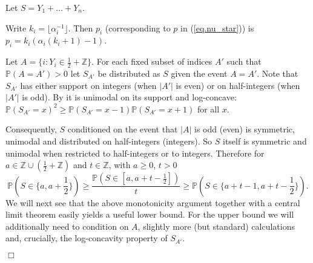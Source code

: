 \documentclass{article}
\newenvironment{proofof}[1]{\noindent {\bf Proof of #1}}{\hspace*{\fill}$\Box$}
\newcommand{\pr}{\mathbb P}
\begin{document}
\begin{proofof}{Lemma~\ref{lem.clt}}
    Let $S = Y_1 + \dots + Y_n$.

    Write $k_i = \lfloor \alpha_i^{-1} \rfloor$. Then $p_i$ (corresponding to $p$ in (\ref{eq.nu_star}))
    is $p_i = k_i (\alpha_i (k_i+1) - 1)$.


    Let $A = \{i: Y_i \in \frac 1 2 + \mathbb{Z}\}$. For each fixed subset of indices $A'$ such that $\pr(A = A') > 0$ let $S_{A'}$ be distributed as $S$ given the event $A = A'$.
    Note that $S_{A'}$ has either support on integers (when $|A'|$ is even) or on half-integers (when $|A'|$ is odd). By \cite{keilsongerber} it is unimodal on its support and log-concave: $\pr(S_{A'} = x)^2 \ge \pr(S_{A'}=x-1) \pr(S_{A'}=x+1)$ for all $x$.

    Consequently, $S$ conditioned on the event that $|A|$ is odd (even) is symmetric, unimodal and distributed on half-integers (integers).
    So $S$ itself is symmetric and unimodal when restricted to half-integers or to integers. Therefore for $a \in \mathbb{Z} \cup (\frac 1 2 + \mathbb{Z})$ and $t \in \mathbb{Z}$, with $a \ge 0$, $t >0$
\[
    \pr(S \in \{a, a+\frac 1 2\}) \ge \frac {\pr(S \in [a, a+t-\frac 1 2])} {t} \ge \pr(S \in \{a+t-1, a+t-\frac 1 2\}).
\]
    We will next see that the above monotonicity argument together with a central limit theorem easily yields a useful lower bound. For the upper bound we will additionally need to condition on $A$, slightly more (but standard) calculations and, crucially, the log-concavity property of $S_{A'}$.


\end{proofof}
\end{document}
